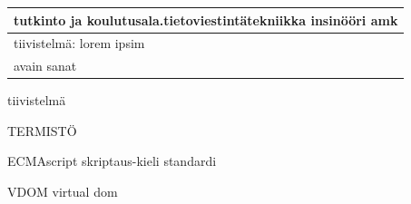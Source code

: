 \documentclass[11pt,a4paper,titlepage,oneside]{article}
\begin{document}
\begin{tabular}{ | l | }
    \begin{minipage}[t][1.5cm][t]{10cm}
    tutkinto ja koulutusala.\newline  tietoviestintätekniikka insinööri amk  

    \end{minipage}\\ \hline

    \begin{minipage}[t][7cm][t]{5cm}
    tiivistelmä: \newline lorem ipsim
    \end{minipage}\\ \hline

    \begin{minipage}[t][2cm][t]{5cm}
    avain sanat
    \end{minipage}\\ \hline

\end{tabular}

\newpage




tiivistelmä








\newpage



\setcounter{page}{0}
\pagestyle{empty}

\tableofcontents





\newpage





TERMISTÖ
\bigskip

 
ECMAscript  \hspace{4cm} skriptaus-kieli standardi 
\bigskip

VDOM \hspace{4cm} virtual dom


\newpage
\end{document}
